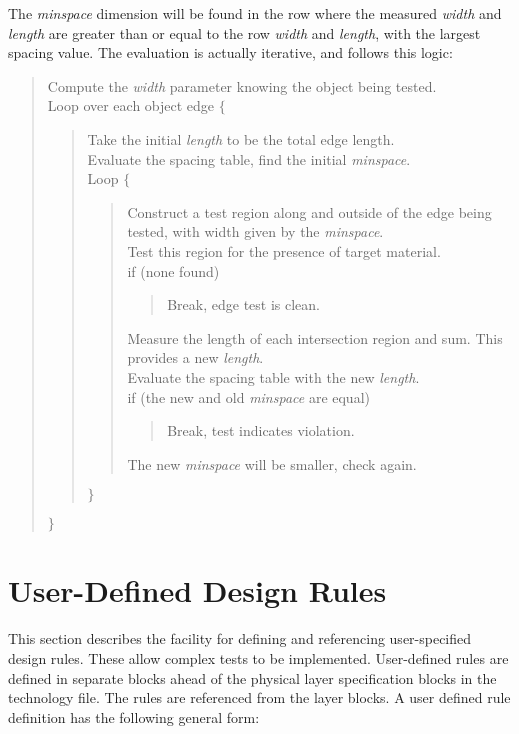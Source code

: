 The {\it minspace} dimension will be found in the row where the
measured {\it width} and {\it length} are greater than or equal to the
row {\it width} and {\it length\/}, with the largest spacing value. 
The evaluation is actually iterative, and follows this logic:

\begin{quote}
  Compute the {\it width} parameter knowing the object being tested.\\
  Loop over each object edge $\{$\\
  \begin{quote}
    Take the initial {\it length} to be the total edge length.\\
    Evaluate the spacing table, find the initial {\it minspace\/}.\\
    Loop $\{$\\
    \begin{quote}
      Construct a test region along and outside of the edge being tested,
      with width given by the {\it minspace\/}.\\
      Test this region for the presence of target material.\\
      if (none found)
      \begin{quote}
        Break, edge test is clean.
      \end{quote}
      Measure the length of each intersection region and sum.  This
      provides a new {\it length}.\\
      Evaluate the spacing table with the new {\it length\/}.\\
      if (the new and old {\it minspace} are equal)
      \begin{quote}
        Break, test indicates violation.
      \end{quote}
      The new {\it minspace} will be smaller, check again.
    \end{quote}
    $\}$
  \end{quote}
  $\}$
\end{quote}


\section{User-Defined Design Rules}
\label{udefrules}

This section describes the facility for defining and referencing
user-specified design rules.  These allow complex tests to be
implemented.  User-defined rules are defined in separate blocks ahead
of the physical layer specification blocks in the technology file. 
The rules are referenced from the layer blocks.  A user defined rule
definition has the following general form:

